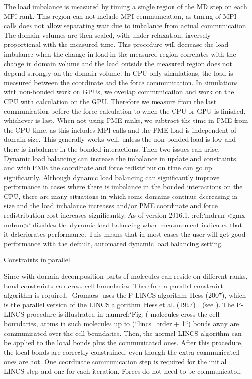 The load imbalance is measured by timing a single region of the MD step
on each MPI rank. This region can not include MPI communication, as
timing of MPI calls does not allow separating wait due to imbalance from
actual communication. The domain volumes are then scaled, with
under-relaxation, inversely proportional with the measured time. This
procedure will decrease the load imbalance when the change in load in
the measured region correlates with the change in domain volume and the
load outside the measured region does not depend strongly on the domain
volume. In CPU-only simulations, the load is measured between the
coordinate and the force communication. In simulations with non-bonded
work on GPUs, we overlap communication and work on the CPU with
calculation on the GPU. Therefore we measure from the last communication
before the force calculation to when the CPU or GPU is finished,
whichever is last. When not using PME ranks, we subtract the time in PME
from the CPU time, as this includes MPI calls and the PME load is
independent of domain size. This generally works well, unless the
non-bonded load is low and there is imbalance in the bonded
interactions. Then two issues can arise. Dynamic load balancing can
increase the imbalance in update and constraints and with PME the
coordinate and force redistribution time can go up significantly.
Although dynamic load balancing can significantly improve performance in
cases where there is imbalance in the bonded interactions on the CPU,
there are many situations in which some domains continue decreasing in
size and the load imbalance increases and/or PME coordinate and force
redistribution cost increases significantly. As of version 2016.1,
:ref:`mdrun <gmx mdrun>` disables the dynamic load balancing when
measurement indicates that it deteriorates performance. This means that
in most cases the user will get good performance with the default,
automated dynamic load balancing setting.

Constraints in parallel
~~~~~~~~~~~~~~~~~~~~~~~

Since with domain decomposition parts of molecules can reside on
different ranks, bond constraints can cross cell boundaries. Therefore a
parallel constraint algorithm is required. |Gromacs| uses the
P-LINCS
algorithm Hess (2007), which is the
parallel version of the LINCS
algorithm Hess
et al. (1997) . (see 
). The P-LINCS
procedure is illustrated in :numref:`Fig. (%
molecules cross the cell boundaries, atoms in such molecules up to
(``lincs_order + 1``) bonds away are communicated over the
cell boundaries. Then, the normal LINCS algorithm can be applied to the
local bonds plus the communicated ones. After this procedure, the local
bonds are correctly constrained, even though the extra communicated ones
are not. One coordinate communication step is required for the initial
LINCS step and one for each iteration. Forces do not need to be
communicated.

